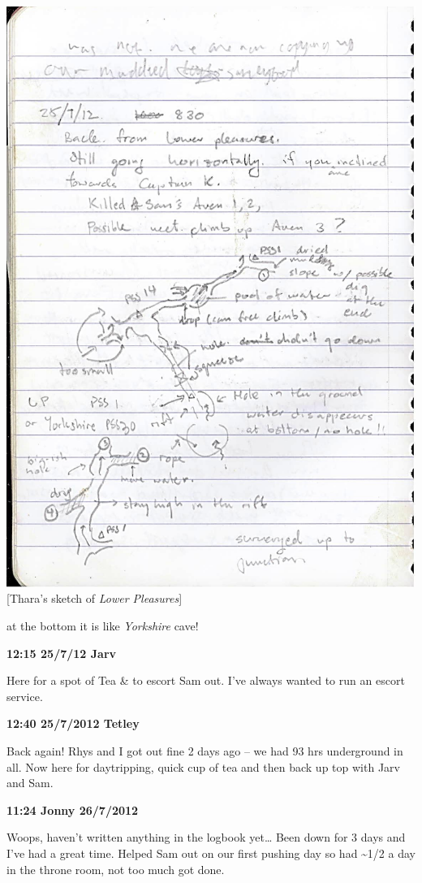\includegraphics{UgLog1012/74.jpeg}\\
{[}Thara's sketch of \emph{Lower Pleasures}{]}

at the bottom it is like \emph{Yorkshire} cave!

\textbf{12:15 25/7/12 Jarv}

Here for a spot of Tea \& to escort Sam out. I've always wanted to run
an escort service.

\textbf{12:40 25/7/2012 Tetley}

Back again! Rhys and I got out fine 2 days ago -- we had 93 hrs
underground in all. Now here for daytripping, quick cup of tea and then
back up top with Jarv and Sam.

\textbf{11:24 Jonny 26/7/2012}

Woops, haven't written anything in the logbook yet\ldots{} Been down for
3 days and I've had a great time. Helped Sam out on our first pushing
day so had \textasciitilde{}1/2 a day in the throne room, not too much
got done.


